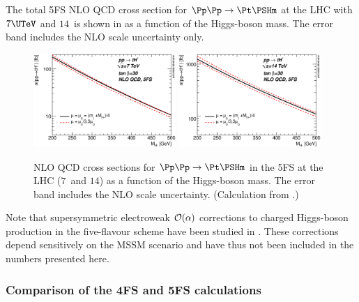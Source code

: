 The total 5FS NLO QCD cross section for 
$\Pp\Pp \to \Pt\PSHm$ at the LHC with $7\UTeV$ and $14$\UTeV\ 
is shown in
 as a function of the Higgs-boson mass.
The error band includes the NLO scale uncertainty only.

\begin{figure}
\begin{center}
\includegraphics[width=0.48\textwidth]{YRHXS_MSSM_charged/YRHXS_MSSM_charged_fig5a.eps}
\includegraphics[width=0.48\textwidth]{YRHXS_MSSM_charged/YRHXS_MSSM_charged_fig5b.eps}
\caption{NLO QCD cross sections for $\Pp\Pp \to {\Pt}\PSHm$ in the 5FS at the LHC ($7$\UTeV\ and $14$\UTeV) as a function of
  the Higgs-boson mass. The error band includes the NLO scale
  uncertainty. (Calculation from .)}
\label{fig:totalxs_5fs}
\end{center}
\end{figure}
        
Note that supersymmetric electroweak ${\cal O(\alpha)}$ corrections to
charged Higgs-boson production in the five-flavour scheme have been
studied in \Bref{Beccaria:2009my}. These corrections depend
sensitively on the MSSM scenario and have thus not been included in
the numbers presented here.

\subsubsection{Comparison of the 4FS and 5FS calculations}
\label{subsubsec:CH_4and5FS}


